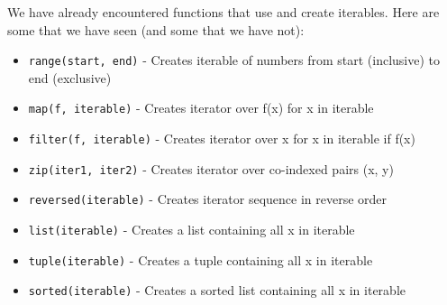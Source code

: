 We have already encountered functions that use and create iterables. Here are
some that we have seen (and some that we have not):

\begin{itemize}
    \item \texttt{range(start, end)} - Creates iterable of numbers from start
        (inclusive) to end (exclusive)
    \item \texttt{map(f, iterable)} - Creates iterator over f(x) for x in iterable
    \item \texttt{filter(f, iterable)} - Creates iterator over x for x in iterable if f(x)
    \item \texttt{zip(iter1, iter2)} - Creates iterator over co-indexed pairs (x, y)
    \item \texttt{reversed(iterable)} - Creates iterator sequence in reverse order
    \item \texttt{list(iterable)} - Creates a list containing all x in iterable
    \item \texttt{tuple(iterable)} - Creates a tuple containing all x in iterable
    \item \texttt{sorted(iterable)} - Creates a sorted list containing all x in iterable
\end{itemize}

